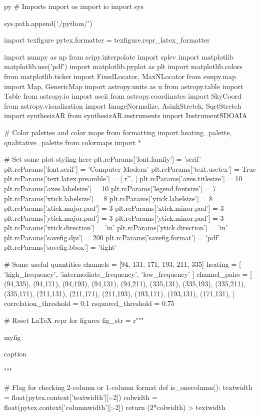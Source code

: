\begin{pythontexcustomcode}{py}
# Imports
import os
import io
import sys

sys.path.append('./python/')

import texfigure
pytex.formatter = texfigure.repr_latex_formatter

import numpy as np
from scipy.interpolate import splev
import matplotlib
matplotlib.use('pdf')
import matplotlib.pyplot as plt
import matplotlib.colors
from matplotlib.ticker import FixedLocator, MaxNLocator
from sunpy.map import Map, GenericMap
import astropy.units as u
from astropy.table import Table
from astropy.io import ascii
from astropy.coordinates import SkyCoord
from astropy.visualization import ImageNormalize, AsinhStretch, SqrtStretch
import synthesizAR
from synthesizAR.instruments import InstrumentSDOAIA

# Color palettes and color maps
from formatting import heating_palette, qualitative_palette
from colormaps import *

# Set some plot styling here
plt.rcParams['font.family'] = 'serif'
plt.rcParams['font.serif'] = 'Computer Modern'
plt.rcParams['text.usetex'] = True
plt.rcParams['text.latex.preamble'] = [
    r'\newcommand\arcsec{\mbox{$^{\prime\prime}$}}',
]
plt.rcParams['axes.titlesize'] = 10
plt.rcParams['axes.labelsize'] = 10
plt.rcParams['legend.fontsize'] = 7
plt.rcParams['xtick.labelsize'] = 8
plt.rcParams['ytick.labelsize'] = 8
plt.rcParams['xtick.major.pad'] = 3
plt.rcParams['xtick.minor.pad'] = 3
plt.rcParams['ytick.major.pad'] = 3
plt.rcParams['ytick.minor.pad'] = 3
plt.rcParams['xtick.direction'] = 'in'
plt.rcParams['ytick.direction'] = 'in'
plt.rcParams['savefig.dpi'] = 200
plt.rcParams['savefig.format'] = 'pdf'
plt.rcParams['savefig.bbox'] = 'tight'

# Some useful quantities
channels = [94, 131, 171, 193, 211, 335]
heating = [
    'high_frequency',
    'intermediate_frequency',
    'low_frequency'
]
channel_pairs = [
    (94,335),
    (94,171),
    (94,193),
    (94,131),
    (94,211),
    (335,131),
    (335,193),
    (335,211),
    (335,171),
    (211,131),
    (211,171),
    (211,193),
    (193,171),
    (193,131),
    (171,131),
]
correlation_threshold = 0.1
rsquared_threshold = 0.75

# Reset LaTeX repr for figures
fig_str = r"""
\begin{{{figure_env_name}}}
    \centering
    {myfig}
    \caption{{{caption}}}
    \label{{{label}}}
\end{{{figure_env_name}}}
"""

# Flag for checking 2-column or 1-column format
def is_onecolumn():
    textwidth = float(pytex.context['textwidth'][:-2])
    colwidth = float(pytex.context['columnwidth'][:-2])
    return (2*colwidth) > textwidth
\end{pythontexcustomcode}